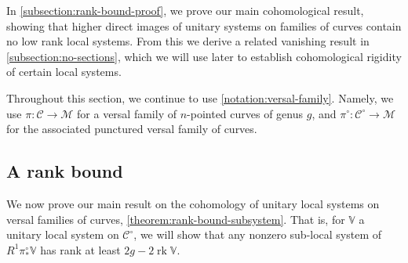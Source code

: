 \documentclass[12 pt]{amsart}
\theoremstyle{plain}
\theoremstyle{definition}
\theoremstyle{remark}
\numberwithin{equation}{section}
\DeclareMathOperator\rk{rk}
\begin{document}
In \autoref{subsection:rank-bound-proof}, we prove our main cohomological result, showing that higher direct images of 
unitary systems on families of curves contain no low rank local systems.
From this we derive a related vanishing result in \autoref{subsection:no-sections},
which we will use later to establish cohomological rigidity of certain local systems.


Throughout this section, we continue to use \autoref{notation:versal-family}.
Namely, we use $\pi:\mathscr{C}\to \mathscr{M}$ for a versal family of
$n$-pointed curves of genus $g$, and $\pi^\circ: \mathscr{C}^\circ \to \mathscr{M}$ for the
associated punctured versal family of curves.

\subsection{A rank bound}
\label{subsection:rank-bound-proof}
We now prove our main result on the cohomology of unitary local systems on versal families of curves,
\autoref{theorem:rank-bound-subsystem}.
That is, for $\mathbb V$ a unitary local system on $\mathscr C^\circ$, we
will show that any nonzero
sub-local system of $R^1 \pi^\circ_* \mathbb V$ has rank at
least $2g-2\rk\mathbb{V}$.
\end{document}
